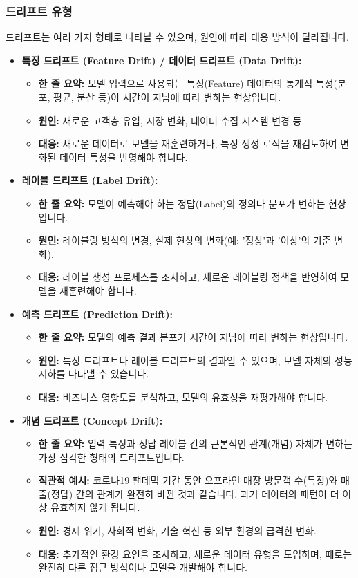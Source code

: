 \documentclass[11pt,a4paper]{article}
\begin{document}
\subsubsection*{드리프트 유형}
드리프트는 여러 가지 형태로 나타날 수 있으며, 원인에 따라 대응 방식이 달라집니다.
\begin{itemize}
    \item \textbf{특징 드리프트 (Feature Drift) / 데이터 드리프트 (Data Drift):}
    \begin{itemize}
        \item \textbf{한 줄 요약:} 모델 입력으로 사용되는 특징(Feature) 데이터의 통계적 특성(분포, 평균, 분산 등)이 시간이 지남에 따라 변하는 현상입니다.
        \item \textbf{원인:} 새로운 고객층 유입, 시장 변화, 데이터 수집 시스템 변경 등.
        \item \textbf{대응:} 새로운 데이터로 모델을 재훈련하거나, 특징 생성 로직을 재검토하여 변화된 데이터 특성을 반영해야 합니다.
    \end{itemize}
    \item \textbf{레이블 드리프트 (Label Drift):}
    \begin{itemize}
        \item \textbf{한 줄 요약:} 모델이 예측해야 하는 정답(Label)의 정의나 분포가 변하는 현상입니다.
        \item \textbf{원인:} 레이블링 방식의 변경, 실제 현상의 변화(예: '정상'과 '이상'의 기준 변화).
        \item \textbf{대응:} 레이블 생성 프로세스를 조사하고, 새로운 레이블링 정책을 반영하여 모델을 재훈련해야 합니다.
    \end{itemize}
    \item \textbf{예측 드리프트 (Prediction Drift):}
    \begin{itemize}
        \item \textbf{한 줄 요약:} 모델의 예측 결과 분포가 시간이 지남에 따라 변하는 현상입니다.
        \item \textbf{원인:} 특징 드리프트나 레이블 드리프트의 결과일 수 있으며, 모델 자체의 성능 저하를 나타낼 수 있습니다.
        \item \textbf{대응:} 비즈니스 영향도를 분석하고, 모델의 유효성을 재평가해야 합니다.
    \end{itemize}
    \item \textbf{개념 드리프트 (Concept Drift):}
    \begin{itemize}
        \item \textbf{한 줄 요약:} 입력 특징과 정답 레이블 간의 근본적인 관계(개념) 자체가 변하는 가장 심각한 형태의 드리프트입니다.
        \item \textbf{직관적 예시:} 코로나19 팬데믹 기간 동안 오프라인 매장 방문객 수(특징)와 매출(정답) 간의 관계가 완전히 바뀐 것과 같습니다. 과거 데이터의 패턴이 더 이상 유효하지 않게 됩니다.
        \item \textbf{원인:} 경제 위기, 사회적 변화, 기술 혁신 등 외부 환경의 급격한 변화.
        \item \textbf{대응:} 추가적인 환경 요인을 조사하고, 새로운 데이터 유형을 도입하며, 때로는 완전히 다른 접근 방식이나 모델을 개발해야 합니다.
    \end{itemize}
\end{itemize}
\end{document}
